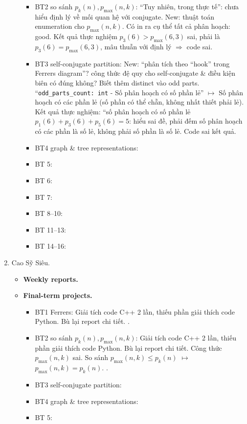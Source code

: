 \documentclass{article}
\begin{document}
\begin{enumerate}
\begin{itemize}
\begin{itemize}
            \item BT2 so sánh $p_k(n),p_{\max}(n,k)$: ``Tuy nhiên, trong thực tế'': chưa hiểu định lý về mối quan hệ với conjugate. New: thuật toán enumeration cho $p_{\max}(n,k)$. Có in ra cụ thể tất cả phân hoạch: good. Kết quả thực nghiệm $p_3(6) > p_{\max}(6,3)$ sai, phải là $p_3(6) = p_{\max}(6,3)$, mâu thuẫn với định lý $\Rightarrow$ code sai.
            \item BT3 self-conjugate partition: New: ``phân tích theo ``hook'' trong Ferrers diagram''? công thức đệ quy cho self-conjugate \& điều kiện biên có đúng không? Biết thêm distinct vào odd parts. ``\verb|odd_parts_count: int| - Số phân hoạch có số phần lẻ'' $\mapsto$ Số phân hoạch có các phần lẻ (số phần có thể chẵn, không nhất thiết phải lẻ). Kết quả thực nghiệm: ``số phân hoạch có số phần lẻ $p_1(6) + p_3(6) + p_5(6) = 5$: hiểu sai đề, phải đếm số phân hoạch có các phần là số lẻ, không phải số phần là số lẻ. Code sai kết quả.
            \item BT4 graph \& tree representations:
            \item BT 5:
            \item BT 6:
            \item BT 7:
            \item BT 8--10:
            \item BT 11--13:
            \item BT 14--16:
        \end{itemize}
    \end{itemize}
    \item {\sc Cao Sỹ Siêu.}
    \begin{itemize}
        \item {\bf Weekly reports.}
        \item {\bf Final-term projects.}
        \begin{itemize}
            \item BT1 Ferrers: Giải tích code C++ 2 lần, thiếu phần giải thích code Python. Bù lại report chi tiết. .
            \item BT2 so sánh $p_k(n),p_{\max}(n,k)$: Giải tích code C++ 2 lần, thiếu phần giải thích code Python. Bù lại report chi tiết. Công thức $p_{\max}(n,k)$ sai. So sánh \st{$p_{\max}(n,k)\le p_k(n)$} $\mapsto$ $p_{\max}(n,k) = p_k(n)$. .
            \item BT3 self-conjugate partition:
            \item BT4 graph \& tree representations:
            \item BT 5:

\end{itemize}
\end{itemize}
\end{enumerate}
\end{document}
